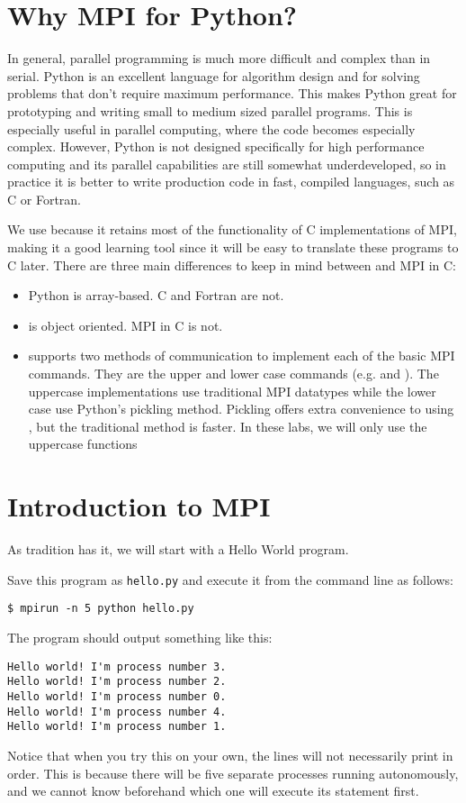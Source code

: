 \section*{Why MPI for Python?}
In general, parallel programming is much more difficult and complex than in serial. Python is an excellent language for algorithm design and for solving problems that don't require maximum performance. This makes Python great for prototyping and writing small to medium sized parallel programs. This is especially useful in parallel computing, where the code becomes especially complex. However, Python is not designed specifically for high performance computing and its parallel capabilities are still somewhat underdeveloped, so in practice it is better to write production code in fast, compiled languages, such as C or Fortran.

We use  because it retains most of the functionality of C implementations of MPI, making it a good learning tool since it will be easy to translate these programs to C later. There are three main differences to keep in mind between  and MPI in C:
\begin{itemize}
    \item Python is array-based. C and Fortran are not.
    \item {} is object oriented. MPI in C is not.
    \item {} supports two methods of communication to implement each of the basic MPI commands. They are the upper and lower case commands (e.g.  and ). The uppercase implementations use traditional MPI datatypes while the lower case use Python's pickling method. Pickling offers extra convenience to using , but the traditional method is faster. In these labs, we will only use the uppercase functions
\end{itemize}


\section*{Introduction to MPI}
As tradition has it, we will start with a Hello World program.

Save this program as \texttt{hello.py} and execute it from the command line as follows:
\begin{lstlisting}[style=ShellInput]
$ mpirun -n 5 python hello.py
\end{lstlisting}
The program should output something like this:
\begin{lstlisting}[style=ShellOutput]
Hello world! I'm process number 3.
Hello world! I'm process number 2.
Hello world! I'm process number 0.
Hello world! I'm process number 4.
Hello world! I'm process number 1.
\end{lstlisting}
Notice that when you try this on your own, the lines will not necessarily print in order. This is because there will be five separate processes running autonomously, and we cannot know beforehand which one will execute its  statement first.

